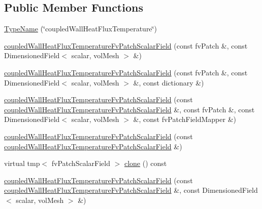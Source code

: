 \subsection*{Public Member Functions}
\begin{DoxyCompactItemize}
\item 
\hyperlink{classFoam_1_1coupledWallHeatFluxTemperatureFvPatchScalarField_a80d01831a76e8ffa9c94ea7fe4a0c3b6}{Type\+Name} (\char`\"{}coupled\+Wall\+Heat\+Flux\+Temperature\char`\"{})
\item 
\hyperlink{classFoam_1_1coupledWallHeatFluxTemperatureFvPatchScalarField_ad4d00982c27a750370f43a0189d5f3a9}{coupled\+Wall\+Heat\+Flux\+Temperature\+Fv\+Patch\+Scalar\+Field} (const fv\+Patch \&, const Dimensioned\+Field$<$ scalar, vol\+Mesh $>$ \&)
\item 
\hyperlink{classFoam_1_1coupledWallHeatFluxTemperatureFvPatchScalarField_a733a2a1f355ace3abbb290f43dc770fe}{coupled\+Wall\+Heat\+Flux\+Temperature\+Fv\+Patch\+Scalar\+Field} (const fv\+Patch \&, const Dimensioned\+Field$<$ scalar, vol\+Mesh $>$ \&, const dictionary \&)
\item 
\hyperlink{classFoam_1_1coupledWallHeatFluxTemperatureFvPatchScalarField_a1dd7e77cae77f9b0aec5acb6b91fd699}{coupled\+Wall\+Heat\+Flux\+Temperature\+Fv\+Patch\+Scalar\+Field} (const \hyperlink{classFoam_1_1coupledWallHeatFluxTemperatureFvPatchScalarField}{coupled\+Wall\+Heat\+Flux\+Temperature\+Fv\+Patch\+Scalar\+Field} \&, const fv\+Patch \&, const Dimensioned\+Field$<$ scalar, vol\+Mesh $>$ \&, const fv\+Patch\+Field\+Mapper \&)
\item 
\hyperlink{classFoam_1_1coupledWallHeatFluxTemperatureFvPatchScalarField_a5fefb851212ac7192b3913d38e65bc6b}{coupled\+Wall\+Heat\+Flux\+Temperature\+Fv\+Patch\+Scalar\+Field} (const \hyperlink{classFoam_1_1coupledWallHeatFluxTemperatureFvPatchScalarField}{coupled\+Wall\+Heat\+Flux\+Temperature\+Fv\+Patch\+Scalar\+Field} \&)
\item 
virtual tmp$<$ fv\+Patch\+Scalar\+Field $>$ \hyperlink{classFoam_1_1coupledWallHeatFluxTemperatureFvPatchScalarField_abeb5f251f04d334f7f18704c9227d8aa}{clone} () const
\item 
\hyperlink{classFoam_1_1coupledWallHeatFluxTemperatureFvPatchScalarField_a09126a35fcc34a31572d50055ca6b416}{coupled\+Wall\+Heat\+Flux\+Temperature\+Fv\+Patch\+Scalar\+Field} (const \hyperlink{classFoam_1_1coupledWallHeatFluxTemperatureFvPatchScalarField}{coupled\+Wall\+Heat\+Flux\+Temperature\+Fv\+Patch\+Scalar\+Field} \&, const Dimensioned\+Field$<$ scalar, vol\+Mesh $>$ \&)

\end{DoxyCompactItemize}
